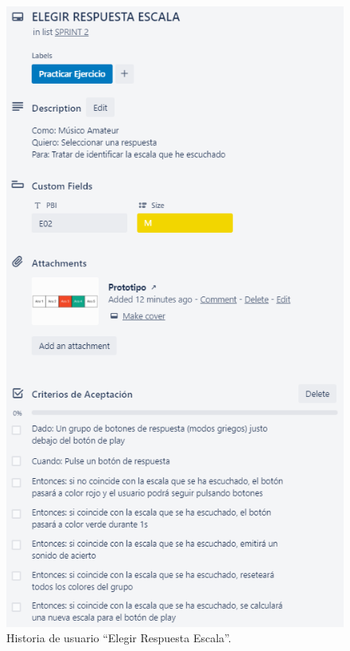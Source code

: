 \documentclass[12pt,twoside,titlepage]{report}
\begin{document}
\begin{figure}[H]
    \centering
    \includegraphics[scale=1.3]{Scrum/User Stories/EscalasRespuestas}
    \caption{Historia de usuario ``Elegir Respuesta Escala''.}
    \label{fig:EscalasRespuestas}
\end{figure}
\end{document}
